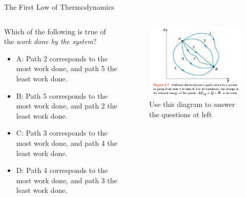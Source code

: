 \documentclass{beamer}
\begin{document}
\begin{frame}{The First Law of Thermodynamics}
\begin{columns}[T]
\begin{column}{0.5\textwidth}
\small Which of the following is true of the \textit{work done by the system}?
\begin{itemize}
\item A: Path 2 corresponds to the most work done, and path 5 the least work done.
\item B: Path 5 corresponds to the most work done, and path 2 the least work done.
\item C: Path 3 corresponds to the most work done, and path 4 the least work done.
\item D: Path 4 corresponds to the most work done, and path 3 the least work done.
\end{itemize}
\end{column}
\begin{column}{0.5\textwidth}
\begin{figure}
\centering
\includegraphics[width=\textwidth]{figures/states1.png}
\caption{\label{fig:states2} Use this diagram to answer the questions at left}
\end{figure}
\end{column}
\end{columns}
\end{frame}
\end{document}
